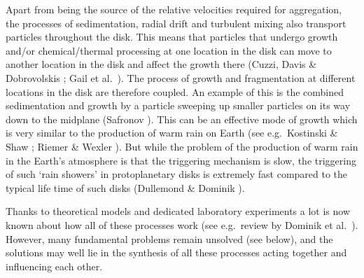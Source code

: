 Apart from being the source of the relative velocities required for
aggregation, the processes of sedimentation, radial drift and turbulent
mixing also transport particles throughout the disk. This means that
particles that undergo growth and/or chemical/thermal processing at one
location in the disk can move to another location in the disk and affect the
growth there (Cuzzi, Davis \& Dobrovolskis ; Gail et
al.~). The process of growth and fragmentation at different
locations in the disk are therefore coupled. An example of this is the
combined sedimentation and growth by a particle sweeping up smaller
particles on its way down to the midplane (Safronov ).  This can
be an effective mode of growth which is very similar to the production of
warm rain on Earth (see e.g.~Kostinski \& Shaw ; Riemer \& Wexler
). But while the problem of the production of warm rain in the
Earth's atmosphere is that the triggering mechanism is slow, the triggering
of such `rain showers' in protoplanetary disks is extremely fast compared to
the typical life time of such disks (Dullemond \& Dominik ).

Thanks to theoretical models and dedicated laboratory experiments a lot is
now known about how all of these processes work (see e.g.~review by Dominik
et al.~). However, many fundamental problems remain unsolved (see
below), and the solutions may well lie in the synthesis of all these
processes acting together and influencing each other.

